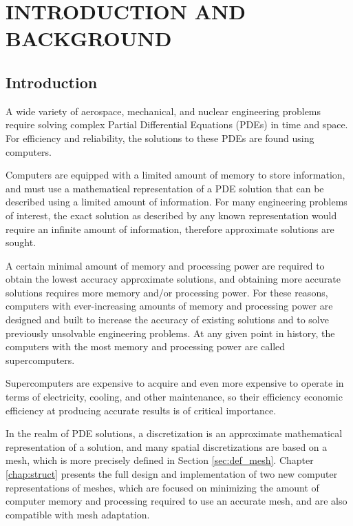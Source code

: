 
\chapter{INTRODUCTION AND BACKGROUND}
\label{chap:intro}

\section{Introduction}

A wide variety of aerospace, mechanical, and nuclear engineering
problems require solving complex Partial Differential
Equations (PDEs) in time and space.
For efficiency and reliability, the solutions to these PDEs are
found using computers.

Computers are equipped with a limited amount of memory to
store information, and must use a mathematical representation
of a PDE solution that can be described using
a limited amount of information.
For many engineering problems of interest, the exact solution
as described by any known representation would require an
infinite amount of information, therefore approximate
solutions are sought.

A certain minimal amount of memory and processing power
are required to obtain the lowest accuracy approximate
solutions, and obtaining more accurate solutions requires
more memory and/or processing power.
For these reasons, computers with ever-increasing amounts
of memory and processing power are designed and built to
increase the accuracy of existing solutions and
to solve previously unsolvable engineering problems.
At any given point in history, the computers with the
most memory and processing power are called supercomputers.

Supercomputers are expensive to acquire and even more
expensive to operate in terms of electricity, cooling, and other
maintenance, so their efficiency economic efficiency
at producing accurate results is of critical importance.

In the realm of PDE solutions, a discretization is an
approximate mathematical representation of a solution,
and many spatial discretizations are based on a mesh,
which is more precisely defined in Section \ref{sec:def_mesh}.
Chapter \ref{chap:struct} presents the full design
and implementation of two new computer representations
of meshes, which are focused on minimizing the amount
of computer memory and processing required to use
an accurate mesh, and are also compatible with mesh adaptation.

